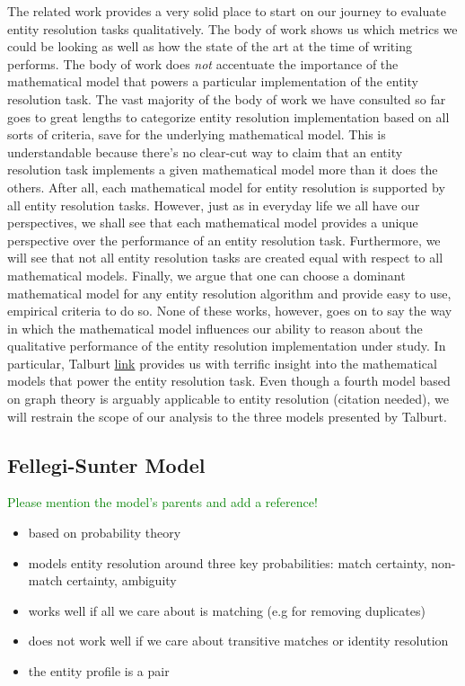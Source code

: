 \documentclass[11pt]{article}
\begin{document}
    The related work provides a very solid place to start on our journey to evaluate entity resolution tasks qualitatively. The body of work shows us which metrics we could be looking as well as how the state of the art at the time of writing performs. The body of work does \textit{not} accentuate the importance of the mathematical model that powers a particular implementation of the entity resolution task. The vast majority of the body of work we have consulted so far goes to great lengths to categorize entity resolution implementation based on all sorts of criteria, save for the underlying mathematical model. This is understandable because there's no clear-cut way to claim that an entity resolution task implements a given mathematical model more than it does the others. After all, each mathematical model for entity resolution is supported by all entity resolution tasks. However, just as in everyday life we all have our perspectives, we shall see that each mathematical model provides a unique perspective over the performance of an entity resolution task. Furthermore, we will see that not all entity resolution tasks are created equal with respect to all mathematical models. Finally, we argue that one can choose a dominant mathematical model for any entity resolution algorithm and provide easy to use, empirical criteria to do so. None of these works, however, goes on to say the way in which the mathematical model influences our ability to reason about the qualitative performance of the entity resolution implementation under study. In particular, Talburt \href{https://learning.oreilly.com/library/view/entity-resolution-and/9780123819734/}{link} provides us with terrific insight into the mathematical models that power the entity resolution task. Even though a fourth model based on graph theory is arguably applicable to entity resolution (citation needed), we will restrain the scope of our analysis to the three models presented by Talburt.

    \subsection[fsm]{Fellegi-Sunter Model}\label{subsec:fsm}

    \textcolor{green}{Please mention the model's parents and add a reference!}
    \begin{itemize}
        \item based on probability theory
        \item models entity resolution around three key probabilities: match certainty, non-match certainty, ambiguity
        \item works well if all we care about is matching (e.g for removing duplicates)
        \item does not work well if we care about transitive matches or identity resolution
        \item the entity profile is a pair
    \end{itemize}
\end{document}
